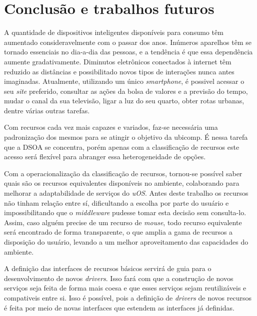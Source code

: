 \chapter{Conclusão e trabalhos futuros}

A quantidade de dispositivos inteligentes disponíveis para consumo têm aumentado consideravelmente com o passar dos anos. Inúmeros aparelhos têm se tornado essenciais no dia-a-dia das pessoas, e a tendência é que essa dependência aumente gradativamente. Diminutos eletrônicos conectados à internet têm reduzido as distâncias e possibilitado novos tipos de interações nunca antes imaginadas. Atualmente, utilizando um único \emph{smartphone}, é possivel acessar o seu \emph{site} preferido, consultar as ações da bolsa de valores e a previsão do tempo, mudar o canal da sua televisão, ligar a luz do seu quarto, obter rotas urbanas, dentre várias outras tarefas.
\begin{comment}
É nesse ambiente cada vez mais ubíquo que a classificação de recursos se insere: ambientes com dispositivos heterogêneos (móveis ou não) interagindo entre si, trocando informações ou utilizando capacidades características de cada aparelho.
\end{comment}

Com recursos cada vez mais capazes e variados, faz-se necessária uma padronização dos mesmos para se atingir o objetivo da ubicomp. É nessa tarefa que a DSOA se concentra, porém apenas com a classificação de recursos este acesso será flexível para abranger essa heterogeneidade de opções.

Com a operacionalização da classificação de recursos, tornou-se possível saber quais são os recursos equivalentes disponíveis no ambiente, colaborando para melhorar a adaptabilidade de serviços do \emph{uOS}. Antes deste trabalho os recursos não tinham relação entre sí, dificultando a escolha por parte do usuário e impossibilitando que o \emph{middleware} pudesse tomar esta decisão sem consulta-lo. Assim, caso alguém precise de um recurso de \emph{mouse}, todo recurso equivalente será encontrado de forma transparente, o que amplia a gama de recursos a disposição do usuário, levando a um melhor aproveitamento das capacidades do ambiente.

A definição das interfaces de recursos básicos servirá de guia para o desenvolvimento de novos \emph{drivers}. Isso fará com que a construção de novos serviços seja feita de forma mais coesa e que esses serviços sejam reutilizáveis e compativeis entre si. Isso é possível, pois a definição de \emph{drivers} de novos recursos é feita por meio de novas interfaces que estendem as interfaces já definidas.

